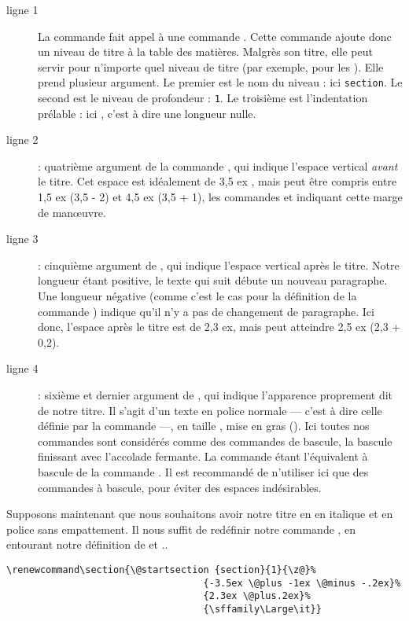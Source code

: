 \begin{description}
\item[ligne 1]La commande  fait appel à une commande \cs{\@startsection}. Cette commande ajoute donc un niveau de titre à la table des matières. Malgrès son titre, elle peut servir pour n'importe quel niveau de titre (par exemple, pour les ). Elle prend plusieur argument. Le premier est le nom du niveau : ici \verb|section|. Le second est le niveau de profondeur : \verb|1|. Le troisième est l'indentation prélable : ici , c'est à dire une longueur nulle.
\item[ligne 2]: quatrième argument de la commande , qui indique l'espace vertical \emph{avant} le titre. Cet espace est idéalement de 3,5 ex , mais peut être compris entre 1,5 ex (3,5 - 2) et 4,5 ex (3,5 + 1), les commandes  et  indiquant cette marge de manœuvre.
\item[ligne 3]: cinquième argument de , qui indique l'espace vertical après le titre. Notre longueur étant positive, le texte qui suit débute un nouveau paragraphe. Une longueur négative (comme c'est le cas pour la définition de la commande ) indique qu'il n'y a pas de changement de paragraphe. Ici donc, l'espace après le titre est de 2,3 ex, mais peut atteindre 2,5 ex (2,3 + 0,2).
\item[ligne 4]: sixième et dernier argument de , qui indique l'apparence proprement dit de notre titre. Il s'agit d'un texte en police normale --- c'est à dire celle définie par la commande  ---, en taille , mise en gras (\cs{\bfseries}). Ici toutes nos commandes sont considérés comme des commandes de bascule, la bascule finissant avec l'accolade fermante. La commande  étant l'équivalent à bascule de la commande . Il est recommandé de n'utiliser ici que des commandes à bascule, pour éviter des espaces indésirables.\label{bfseries}
\end{description}

Supposons maintenant que nous souhaitons avoir notre titre en en italique et en police sans empattement. Il nous suffit de redéfinir notre commande , en entourant notre définition de  et ..

\begin{verbatim}
\renewcommand\section{\@startsection {section}{1}{\z@}%
                                   {-3.5ex \@plus -1ex \@minus -.2ex}%
                                   {2.3ex \@plus.2ex}%
                                   {\sffamily\Large\it}}
\end{verbatim}

